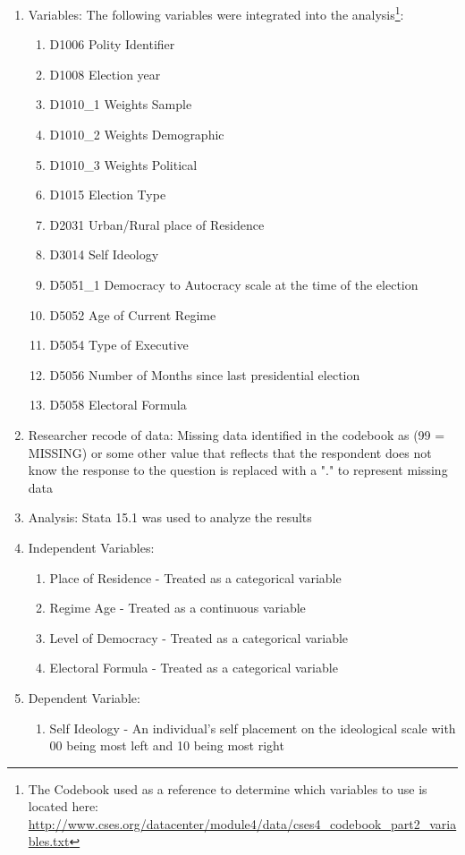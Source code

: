 \documentclass[12pt]{article}
\begin{document}
\begin{enumerate}
\item Variables: The following variables were integrated into the analysis\footnote{The Codebook used as a reference to determine which variables to use is located here: \url{http://www.cses.org/datacenter/module4/data/cses4_codebook_part2_variables.txt}}:
\begin{enumerate}
	\item D1006 Polity Identifier
	\item D1008 Election year
	\item D1010\_1 Weights Sample
	\item D1010\_2 Weights Demographic
	\item D1010\_3 Weights Political 
	\item D1015 Election Type
	\item D2031 Urban/Rural place of Residence
	\item D3014 Self Ideology
	\item D5051\_1 Democracy to Autocracy scale at the time of the election
	\item D5052 Age of Current Regime
	\item D5054 Type of Executive
	\item D5056 Number of Months since last presidential election
	\item D5058 Electoral Formula
\end{enumerate} 
\item Researcher recode of data: Missing data identified in the codebook as (99 = MISSING) or some other value that reflects that the respondent does not know the response to the question is replaced with a "." to represent missing data
\item Analysis: Stata 15.1 was used to analyze the results
\item Independent Variables:
\begin{enumerate}
	\item Place of Residence - Treated as a categorical variable
	\item Regime Age - Treated as a continuous variable
	\item Level of Democracy - Treated as a categorical variable
	\item Electoral Formula - Treated as a categorical variable
\end{enumerate}
\item Dependent Variable:
\begin{enumerate}
	\item Self Ideology - An individual's self placement on the ideological scale with 00 being most left and 10 being most right
\end{enumerate}
\end{enumerate}

\clearpage
\nocite{*}


\end{document}
